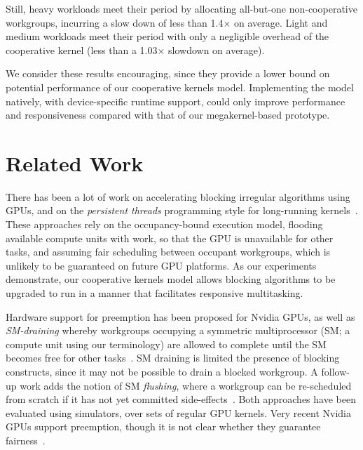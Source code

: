 \documentclass[parskip=half,sigconf,review, anonymous=true, acmcopyrightmode=none]{acmart}
\newcommand{\nvidia}{Nvidia\xspace}
\begin{document}
Still, heavy workloads meet their period by allocating all-but-one
non-cooperative workgroups, incurring a slow down of less than
1.4$\times$ on average. Light and medium workloads meet their period
with only a negligible overhead of the cooperative kernel (less than a
1.03$\times$ slowdown on average).

We consider these results encouraging, since they provide a lower
bound on potential performance of our cooperative kernels
model. Implementing the model natively, with device-specific runtime
support, could only improve performance and responsiveness compared
with that of our megakernel-based prototype.

\section{Related Work}\label{sec:relatedwork}

%
There has been a lot of work on accelerating blocking irregular
algorithms using GPUs, and on the \emph{persistent threads}
programming style for long-running
kernels~\cite{owens-persistent,DBLP:conf/ipps/KaleemVPHP16,DBLP:conf/ipps/DavidsonBGO14,DBLP:conf/hipc/HarishN07,DBLP:journals/topc/MerrillGG15,DBLP:conf/egh/VineetHPN09,DBLP:conf/ppopp/NobariCKB12,DBLP:conf/hpcc/SolomonTT10a,DBLP:conf/popl/PrabhuRMH11,DBLP:conf/ppopp/Mendez-LojoBP12,DBLP:conf/oopsla/PaiP16,DBLP:conf/oopsla/SorensenDBGR16,DBLP:conf/egh/CedermanT08,TPO10,BNP12,Pannotia}.
These approaches rely on the occupancy-bound execution model, flooding
available compute units with work, so that the GPU is unavailable for
other tasks, and assuming fair scheduling between occupant workgroups,
which is unlikely to be guaranteed on future GPU platforms.
%
As our experiments demonstrate, our cooperative kernels model allows blocking algorithms
to be upgraded to run in a manner that facilitates responsive multitasking.


%
Hardware support for preemption has been proposed for \nvidia GPUs,
as well as \emph{SM-draining}
whereby workgroups occupying a symmetric multiprocessor (SM; a compute
unit using our terminology) are allowed to complete until the SM becomes free for
other tasks~\cite{DBLP:conf/isca/TanasicGCRNV14}.  SM draining is limited the presence of blocking constructs, since it may not be possible to drain a blocked workgroup.
%
A follow-up work adds the notion of SM \emph{flushing},
where a workgroup can be re-scheduled
from scratch if it has not yet committed side-effects~\cite{DBLP:conf/asplos/ParkPM15}.  Both approaches have been evaluated
using simulators, over sets of regular GPU kernels.  Very recent \nvidia GPUs support
preemption, though it is not clear whether they guarantee fairness~\cite{PascalWhitepaper}.
\end{document}
